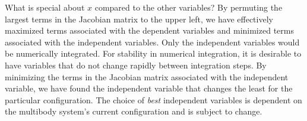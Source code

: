 \documentclass[12pt]{article}   %
\begin{document}
What is special about $x$ compared to the other variables? By permuting the largest terms in the Jacobian matrix to the upper left, we have effectively maximized terms associated with the dependent variables and minimized terms associated with the independent variables. Only the independent variables would be numerically integrated. For stability in numerical integration, it is desirable to have variables that do not change rapidly between integration steps. By minimizing the terms in the Jacobian matrix associated with the independent variable, we have found the independent variable that changes the least for the particular configuration. The choice of \emph{best} independent variables is dependent on the multibody system's current configuration and is subject to change. 




\end{document}
